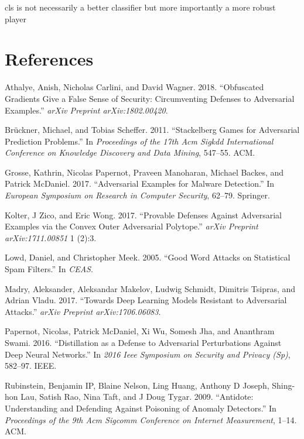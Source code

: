 \documentclass[10pt]{article}
\begin{document}
cls is not necessarily a better classifier but more importantly a more
robust player

\section*{References}

\hypertarget{refs}{}
\leavevmode\hypertarget{ref-obfuscated_gradients}{}%
Athalye, Anish, Nicholas Carlini, and David Wagner. 2018. “Obfuscated
Gradients Give a False Sense of Security: Circumventing Defenses to
Adversarial Examples.” \emph{arXiv Preprint arXiv:1802.00420}.

\leavevmode\hypertarget{ref-stackelberg_games}{}%
Brückner, Michael, and Tobias Scheffer. 2011. “Stackelberg Games for
Adversarial Prediction Problems.” In \emph{Proceedings of the 17th Acm
Sigkdd International Conference on Knowledge Discovery and Data Mining},
547–55. ACM.

\leavevmode\hypertarget{ref-adversarial_malware}{}%
Grosse, Kathrin, Nicolas Papernot, Praveen Manoharan, Michael Backes,
and Patrick McDaniel. 2017. “Adversarial Examples for Malware
Detection.” In \emph{European Symposium on Research in Computer
Security}, 62–79. Springer.

\leavevmode\hypertarget{ref-provable_defenses}{}%
Kolter, J Zico, and Eric Wong. 2017. “Provable Defenses Against
Adversarial Examples via the Convex Outer Adversarial Polytope.”
\emph{arXiv Preprint arXiv:1711.00851} 1 (2):3.

\leavevmode\hypertarget{ref-good_word_attacks}{}%
Lowd, Daniel, and Christopher Meek. 2005. “Good Word Attacks on
Statistical Spam Filters.” In \emph{CEAS}.

\leavevmode\hypertarget{ref-towards_deep_learning_models}{}%
Madry, Aleksander, Aleksandar Makelov, Ludwig Schmidt, Dimitris Tsipras,
and Adrian Vladu. 2017. “Towards Deep Learning Models Resistant to
Adversarial Attacks.” \emph{arXiv Preprint arXiv:1706.06083}.

\leavevmode\hypertarget{ref-papernot_distillation}{}%
Papernot, Nicolas, Patrick McDaniel, Xi Wu, Somesh Jha, and Ananthram
Swami. 2016. “Distillation as a Defense to Adversarial Perturbations
Against Deep Neural Networks.” In \emph{2016 Ieee Symposium on Security
and Privacy (Sp)}, 582–97. IEEE.

\leavevmode\hypertarget{ref-antidote}{}%
Rubinstein, Benjamin IP, Blaine Nelson, Ling Huang, Anthony D Joseph,
Shing-hon Lau, Satish Rao, Nina Taft, and J Doug Tygar. 2009. “Antidote:
Understanding and Defending Against Poisoning of Anomaly Detectors.” In
\emph{Proceedings of the 9th Acm Sigcomm Conference on Internet
Measurement}, 1–14. ACM.
\end{document}

